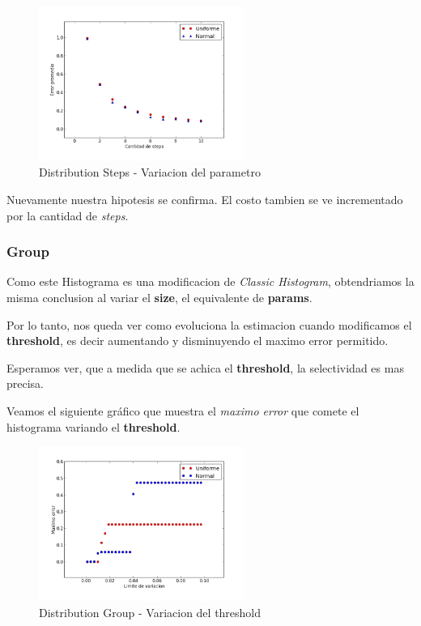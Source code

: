 \documentclass[10pt, a4paper,english,spanish,hidelinks]{article}
\begin{document}
\begin{figure}[h!]
  \centering
  \includegraphics[width=0.6\textwidth]{./imagenes/ejb2_step_parameter_variation.png}
  \caption{Distribution Steps - Variacion del parametro}
\end{figure}

Nuevamente nuestra hipotesis se confirma. El costo tambien se ve incrementado por
la cantidad de \textit{steps}.




\subsubsection{Group}

Como este Histograma es una modificacion de \textit{Classic Histogram}, obtendriamos la misma
conclusion al variar el \textbf{size}, el equivalente de \textbf{params}.

Por lo tanto, nos queda ver como evoluciona la estimacion cuando modificamos el
\textbf{threshold}, es decir aumentando y disminuyendo el maximo error permitido.

Esperamos ver, que a medida que se achica el \textbf{threshold}, la selectividad es mas precisa.


Veamos el siguiente gráfico que muestra el \textit{maximo error} que comete el histograma
variando el \textbf{threshold}.

\begin{figure}[h!]
  \centering
  \includegraphics[width=0.6\textwidth]{./imagenes/ejb2_group_parameter_variation.png}
  \caption{Distribution Group - Variacion del threshold}
\end{figure}
\end{document}
